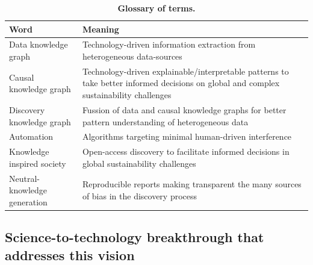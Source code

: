 \documentclass[11pt, a4paper]{article} %
\begin{document}
   
\begin{table}[ht]
\begin{tabular}{ p{6cm} | p{11cm}}
  \hline \hline
  \textbf{Word} &\textbf{Meaning}\\  \hline
  Data knowledge graph & Technology-driven information extraction from heterogeneous data-sources  \\ \hline
  Causal knowledge graph & Technology-driven explainable/interpretable patterns to take better informed decisions on global and complex sustainability challenges\\ \hline
  Discovery knowledge graph & Fussion of data and causal knowledge graphs for better pattern understanding of heterogeneous data\\ \hline
  Automation & Algorithms targeting minimal human-driven interference\\ \hline
  Knowledge inspired society & Open-access discovery to facilitate informed decisions in global sustainability challenges \\ \hline
  Neutral-knowledge generation & Reproducible reports making transparent the many sources of bias in the discovery process\\ \hline
  \bottomrule
\end{tabular}
\caption{{\bf Glossary of terms.}}
\end{table}

\subsection{Science-to-technology breakthrough that addresses this vision}
\end{document}
